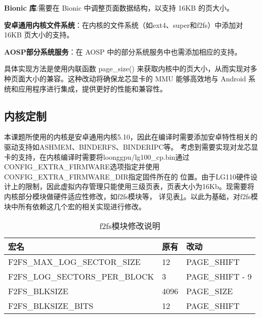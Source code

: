 \textbf{Bionic 库}:需要在 Bionic 中调整页面数据结构，以支持 16KB 的页大小。

\textbf{安卓通用内核文件系统}：在内核的文件系统（如ext4、super和f2fs）中添加对 16KB 页大小的支持。

\textbf{AOSP部分系统服务}：在 AOSP 中的部分系统服务中也需添加相应的支持。

具体实现方法是使用内联函数 page\_size() 来获取内核中的页大小，从而实现对多种页面大小的兼容。这种改动将确保龙芯显卡的 MMU 
能够高效地与 Android 系统和应用程序进行集成，提供更好的性能和兼容性。


\subsection{内核定制}
本课题所使用的内核是安卓通用内核5.10，因此在编译时需要添加安卓特性相关的驱动支持如ASHMEM、BINDERFS、BINDERIPC等。
考虑到需要实现对龙芯显卡的支持，在内核编译时需要将loonggpu/lg100\_cp.bin通过CONFIG\_EXTRA\_FIRMWARE选项指定并使用CONFIG\_EXTRA\_FIRMWARE\_DIR指定固件所在的
位置。由于LG110硬件设计上的限制，因此虚拟内存管理只能使用三级页表，页表大小为16Kb。现需要将内核部分模块做硬件适应性修改，如f2fs模块等，
详见表\ref{tab:f2fs模块修改说明}。以此为基础，对f2fs模块中所有依赖这几个宏的相关实现进行修改。

\begin{table}[h]
  \centering
  \caption{f2fs模块修改说明}
  \label{tab:f2fs模块修改说明}
  \begin{tabular}{lll}
    \toprule
    宏名   &   原有  &改动  \\
    \midrule
    F2FS\_MAX\_LOG\_SECTOR\_SIZE & 12 & PAGE\_SHIFT \\
    F2FS\_LOG\_SECTORS\_PER\_BLOCK & 3 & PAGE\_SHIFT - 9 \\
    F2FS\_BLKSIZE & 4096 & PAGE\_SIZE \\
    F2FS\_BLKSIZE\_BITS & 12 & PAGE\_SHIFT \\
    \bottomrule
  \end{tabular}
  \note{}
\end{table}

